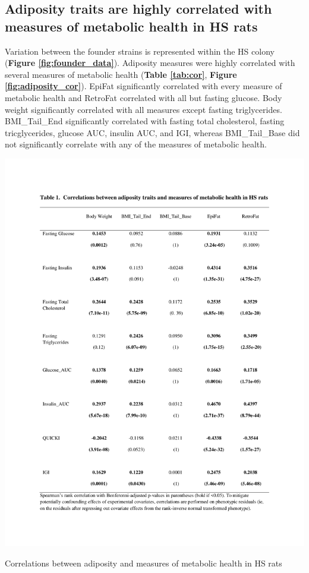 \subsection{Adiposity traits are highly correlated with measures of metabolic health in HS rats}

Variation between the founder strains is represented within the HS colony (\textbf{Figure \ref{fig:founder_data}}). Adiposity measures were highly correlated with several measures of metabolic health (\textbf{Table \ref{tab:cor}}, \textbf{Figure \ref{fig:adiposity_cor}}). EpiFat significantly correlated with every measure of metabolic health and RetroFat correlated with all but fasting glucose. Body weight significantly correlated with all measures except fasting triglycerides. BMI\_Tail\_End significantly correlated with fasting total cholesterol, fasting tricglycerides, glucose AUC, insulin AUC, and IGI, whereas BMI\_Tail\_Base did not significantly correlate with any of the measures of metabolic health.

\begin{table}
\centering
\includegraphics[trim={0in 1in 0in 1.2in}, clip, width=\textwidth]{figures/5-hsrats/Table1.pdf}
\caption{Correlations between adiposity and measures of metabolic health in HS rats \label{tab:cor}}
\end{table}

